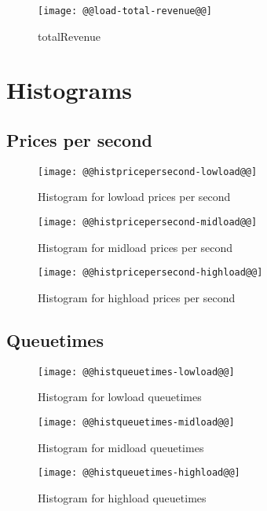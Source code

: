 \documentclass[11pt]{article}
\begin{document}
\begin{figure}[htbp]
  \begin{center}
    \texttt{[image: @@load-total-revenue@@]}
    \caption{totalRevenue}
    \label{fig:totalRevenue}
  \end{center}
\end{figure}


\newpage
\section{Histograms}

\subsection{Prices per second}
\begin{figure}[htbp]
  \begin{center}
    \texttt{[image: @@histpricepersecond-lowload@@]}
    \caption{Histogram for lowload prices per second}
    \label{fig:histpricepersecond-lowload}
  \end{center}
\end{figure}
\begin{figure}[htbp]
  \begin{center}
    \texttt{[image: @@histpricepersecond-midload@@]}
    \caption{Histogram for midload prices per second}
    \label{fig:histpricepersecond-midload}
  \end{center}
\end{figure}
\begin{figure}[htbp]
  \begin{center}
    \texttt{[image: @@histpricepersecond-highload@@]}
    \caption{Histogram for highload prices per second}
    \label{fig:histpricepersecond-highload}
  \end{center}
\end{figure}

\newpage
\subsection{Queuetimes}
\begin{figure}[htbp]
  \begin{center}
    \texttt{[image: @@histqueuetimes-lowload@@]}
    \caption{Histogram for lowload queuetimes}
    \label{fig:histqueuetimes-lowload}
  \end{center}
\end{figure}
\begin{figure}[htbp]
  \begin{center}
    \texttt{[image: @@histqueuetimes-midload@@]}
    \caption{Histogram for midload queuetimes}
    \label{fig:histqueuetimes-midload}
  \end{center}
\end{figure}
\begin{figure}[htbp]
  \begin{center}
    \texttt{[image: @@histqueuetimes-highload@@]}
    \caption{Histogram for highload queuetimes}
    \label{fig:histqueuetimes-highload}
  \end{center}
\end{figure}
\end{document}
